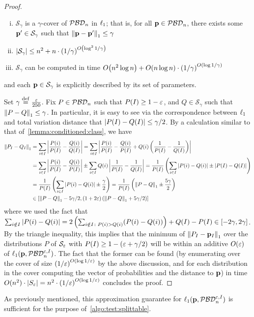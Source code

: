 \begin{proof}
\begin{theorem}[{\cite[Theorem 1]{DP:13}}]
\begin{enumerate}[(i)]
  \item $\mathcal{S}_{\gamma}$ is a $\gamma$-cover of $\classpbd[n]$ in $\lp[1]$; that is, for all $\D \in \classpbd[n]$, there exists some $\D^\prime \in \mathcal{S}_{\gamma}$ such that $\normone{\D-\D^\prime} \leq \gamma$
  \item {$\abs{\mathcal{S}_{\gamma}} \le n^2 + n \cdot \left({1/\gamma}\right)^{\bigO{ \log^2{1/\gamma}}}$}
  \item $\mathcal{S}_{\gamma}$ can be computed in time {$\bigO{ n^2 \log n} + \bigO{n \log n} \cdot \left( {1/\gamma} \right)^{\bigO{\log{1/\gamma}}}$}
  \end{enumerate}
and each $\D\in\mathcal{S}_{\gamma}$  is explicitly described by its set of parameters.
\end{theorem}
\fi

Set $\gamma\eqdef\frac{\eps}{250}$. Fix $P\in\classpbd[n]$ such that $P(I) \geq 1-\eps$, and $Q\in \mathcal{S}_{\gamma}$ such that $\normone{P-Q}\leq \gamma$. In particular, it is easy to see via the correspondence between $\lp[1]$ and total variation distance that $\abs{P(I)-Q(I)} \leq \gamma/2$.
By a calculation similar to that of~\cref{lemma:conditioned:class}, we have 
\begin{align*}
  \normone{P_I-Q_I} &= \sum_{i\in I}\abs{\frac{P(i)}{P(I)} - \frac{Q(i)}{Q(I)}} 
  = \sum_{i\in I}\abs{\frac{P(i)}{P(I)} - \frac{Q(i)}{P(I)} + Q(i)\left( \frac{1}{P(I)} - \frac{1}{Q(I)} \right) } \\
  &= \sum_{i\in I}\abs{\frac{P(i)}{P(I)} - \frac{Q(i)}{P(I)} } \pm \sum_{i\in I} Q(i)\abs{ \frac{1}{P(I)} - \frac{1}{Q(I)} }
  = \frac{1}{P(I)}\left( \sum_{i\in I}\abs{ P(i) - Q(i) } \pm \abs{P(I)-Q(I)}\right) \\
  &= \frac{1}{P(I)}\left( \sum_{i\in I}\abs{ P(i) - Q(i) } \pm \frac{\gamma}{2}\right) = \frac{1}{P(I)}\left( \normone{ P - Q } \pm \frac{5\gamma}{2}\right) \\
  &\in [ \normone{ P - Q } - {5\gamma}/{2}, (1+2\eps)\left( \normone{ P - Q } + {5\gamma}/{2} \right) ]
  \end{align*}
where we used the fact that $\sum_{i\notin I}\abs{ P(i) - Q(i) } = 2\left(\sum_{i\notin I\colon P(i) > Q(i)} (P(i)-Q(i))\right) + Q(I)-P(I) \in [-2\gamma,2\gamma]$.
By the triangle inequality, this implies that the minimum of $\normone{P_I-\D_I}$ over the distributions $P$ of $\mathcal{S}_\eps$ with $P(I)\geq 1-(\eps+\gamma/2)$ will be within an additive $\bigO{\eps}$ of $\lp[1](\D,\classpbd[n]^{\eps,I})$. The fact that the former can be found (by enumerating over the cover of size $\left( {1/\eps} \right)^{\bigO{\log{1/\eps}}}$ by the above discussion, and for each distribution in the cover computing the vector of probabilities and the distance to $\D$) in time $O(n^2)\cdot\abs{S_\eps}=n^2 \cdot \left( {1/\eps} \right)^{\bigO{\log{1/\eps}}}$ concludes the proof.
\end{proof}
As previously mentioned, this approximation guarantee for $\lp[1](\D,\classpbd[n]^{\eps,I})$ is sufficient for the purpose of~\cref{algo:test:splittable}.

